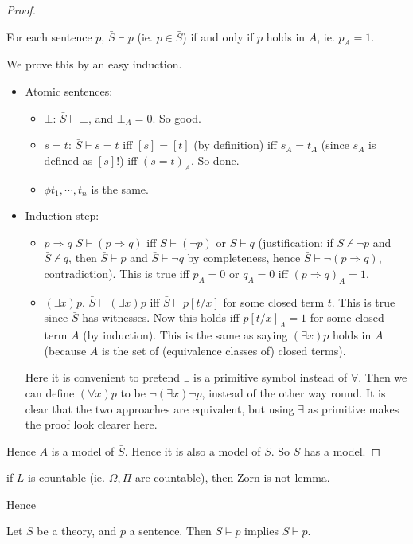 \documentclass[a4paper]{article}
\begin{document}
\begin{proof}
  \begin{claim}
    For each sentence $p$, $\bar S\vdash p$ (ie. $p\in \bar S$) if and only if $p$ holds in $A$, ie. $p_A = 1$.
  \end{claim}
  We prove this by an easy induction.
  \begin{itemize}
    \item Atomic sentences:
      \begin{itemize}
        \item $\bot$: $\bar S \vdash \bot$, and $\bot_A = 0$. So good.
        \item $s = t$: $\bar S \vdash s = t$ iff $[s] = [t]$ (by definition) iff $s_A = t_A$ (since $s_A$ is defined as $[s]$!) iff $(s = t)_A$. So done.
        \item $\phi t_1, \cdots, t_n$ is the same.
      \end{itemize}
    \item Induction step:
      \begin{itemize}
        \item $p\Rightarrow q$ $\bar S\vdash (p \Rightarrow  q)$ iff $\bar S \vdash (\neg p)$ or $\bar S\vdash q$ (justification: if $\bar S \not\vdash \neg p$ and $\bar S\not\vdash q$, then $\bar S\vdash p$ and $\bar S \vdash \neg q$ by completeness, hence $\bar S\vdash \neg(p\Rightarrow q)$, contradiction). This is true iff $p_A = 0$ or $q_A = 0$ iff $(p\Rightarrow q)_A = 1$.
        \item $(\exists x)p$. $\bar S \vdash (\exists x)p$ iff $\bar S\vdash p[t/x]$ for some closed term $t$. This is true since $\bar S$ has witnesses. Now this holds iff $p[t/x]_A = 1$ for some closed term $A$ (by induction). This is the same as saying $(\exists x)p$ holds in $A$ (because $A$ is the set of (equivalence classes of) closed terms).
      \end{itemize}
      \note Here it is convenient to pretend $\exists$ is a primitive symbol instead of $\forall$. Then we can define $(\forall x) p$ to be $\neg (\exists x)\neg p$, instead of the other way round. It is clear that the two approaches are equivalent, but using $\exists $ as primitive makes the proof look clearer here.
  \end{itemize}
  Hence $A$ is a model of $\bar S$. Hence it is also a model of $S$. So $S$ has a model.
\end{proof}
\note if $L$ is countable (ie. $\Omega, \Pi$ are countable), then Zorn is not lemma.

Hence
\begin{cor}
  Let $S$ be a theory, and $p$ a sentence. Then $S\models p$ implies $S\vdash p$.
\end{cor}
\end{document}

